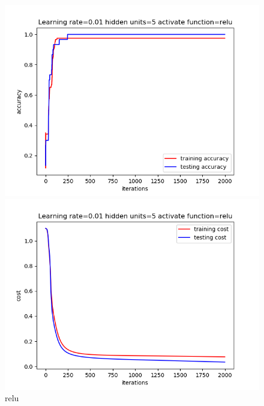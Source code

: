\documentclass{article}
\begin{document}
\begin{figure}[htb] 
    \centering 
    \begin{minipage}[t]{0.5\linewidth}
    \centering 
    \includegraphics[scale=0.3]{accuracy_relu_5.png} 
    \end{minipage}%
    \begin{minipage}[t]{0.5\linewidth} 
    \centering 
    \includegraphics[scale=0.3]{cost_relu_5.png} 
    \end{minipage}%
    \centering 
    \caption{relu}
    \centering 
    \begin{minipage}[t]{0.5\linewidth}
    \centering 

\end{minipage}
\end{figure}
\end{document}
